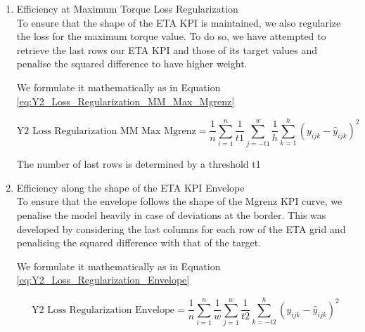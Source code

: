 \documentclass{report} %
\begin{document}
\begin{enumerate}

\item Efficiency at Maximum Torque Loss Regularization \\

To ensure that the shape of the ETA \ac{KPI} is maintained, we also regularize the loss for the maximum torque value.
To do so, we have attempted to retrieve the last rows our ETA \ac{KPI} and those of its target values and penalise the squared difference to have higher weight.

We formulate it mathematically as in Equation \ref{eq:Y2_Loss_Regularization_MM_Max_Mgrenz}

\begin{equation}
    \text{Y2 Loss Regularization MM Max Mgrenz} = \frac{1}{n} \sum_{i=1}^{n} \frac{1}{t1} \sum_{j=-t1}^{w} \frac{1}{h} \sum_{k=1}^{h} (y_{ijk} - \hat{y}_{ijk})^2
    \label{eq:Y2_Loss_Regularization_MM_Max_Mgrenz}
\end{equation}


\vspace{0.2cm} %

The number of last rows is determined by a threshold t1

\item Efficiency along the shape of the ETA \ac{KPI} Envelope \\

To ensure that the envelope follows the shape of the Mgrenz \ac{KPI} curve, we penalise the model heavily in case of deviations at the border.
This was developed by considering the last columns for each row of the ETA grid and penalising the squared difference with that of the target.

We formulate it mathematically as in Equation \ref{eq:Y2_Loss_Regularization_Envelope}

\begin{equation}
    \text{Y2 Loss Regularization Envelope} = \frac{1}{n} \sum_{i=1}^{n} \frac{1}{w} \sum_{j=1}^{w} \frac{1}{t2} \sum_{k=-t2}^{h} (y_{ijk} - \hat{y}_{ijk})^2
    \label{eq:Y2_Loss_Regularization_Envelope}
\end{equation}


\end{enumerate}
\end{document}
